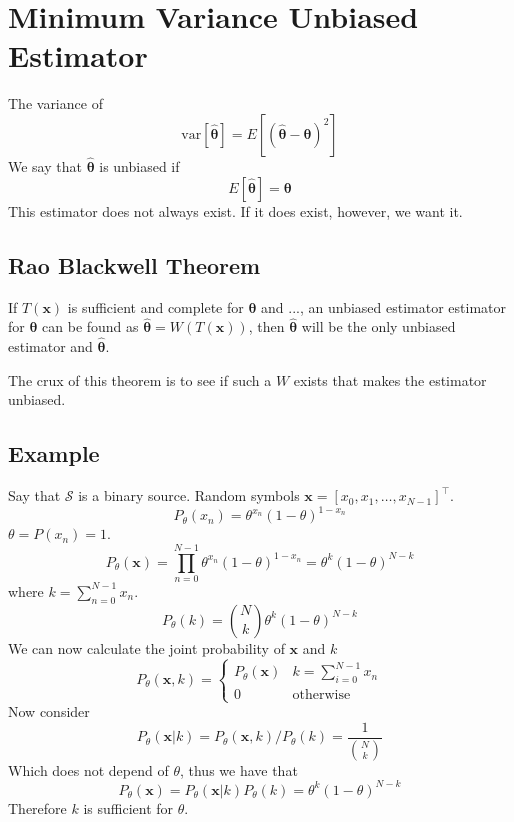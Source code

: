 \documentclass[a4paper]{article}
\begin{document}
\section*{Minimum Variance Unbiased Estimator}%
The variance of
\[
  \text{var} \left[ \hat{\bm{\theta}} \right] = E \left[ \left( \hat{\bm{\theta}} - \bm{\theta} \right)^2 \right]
\]
We say that $\hat{\bm{\theta}}$ is unbiased if 
\[
  E \left[ \hat{\bm{\theta}} \right] = \bm{\theta}
\]
This estimator does not always exist. If it does exist, however, we want it.

\subsection*{Rao Blackwell Theorem}%
If $T(\mathbf{x})$ is sufficient and complete for $\bm{\theta}$ and ..., an unbiased estimator estimator for $\bm{\theta}$ can be found as $\hat{\bm{\theta}} = W(T(\bm{x}))$, then $\hat{\bm{\theta}}$ will be the only unbiased estimator and $\hat{\bm{\theta}}$. 

The crux of this theorem is to see if such a $W$ exists that makes the estimator unbiased.

\subsection*{Example}%
Say that $\mathcal{S}$ is a binary source. Random symbols $\mathbf{x} = [x_0, x_1, \dots, x_{N-1}]^\top$.
\[
  P_{\theta}(x_n) = \theta^{x_n}(1 - \theta)^{1-x_n}
\]
$\theta = P(x_n) = 1$. 
\[
  P_{\theta}(\mathbf{x}) = \prod_{n=0}^{N-1} \theta^{x_n}(1 - \theta)^{1- x_n} = \theta^k(1-\theta)^{N-k}
\]
where $k = \sum_{n=0}^{N-1}x_n$.
\[
  P_{\theta}(k) =  {N \choose k} \theta^k(1-\theta)^{N-k}
\]
We can now calculate the joint probability of $\mathbf{x}$ and $k$
\[
  P_{\theta}(\mathbf{x}, k) =
  \begin{cases}
    P_{\theta}(\mathbf{x}) & k=\sum_{i=0}^{N-1}x_n \\
    0 & \text{otherwise}
    
  \end{cases}
\]
Now consider 
\[
P_{\theta}(\mathbf{x} | k) = P_{\theta}(\mathbf{x}, k)/P_{\theta}(k)
= \frac{1}{{N \choose k}}
\]
Which does not depend of $\theta$, thus we have that
\[
  P_{\theta}(\mathbf{x}) = P_{\theta}(\mathbf{x}|k)P_{\theta}(k) = 
  \theta^k(1-\theta)^{N-k}
\]
Therefore $k$ is sufficient for $\theta$.
\end{document}
